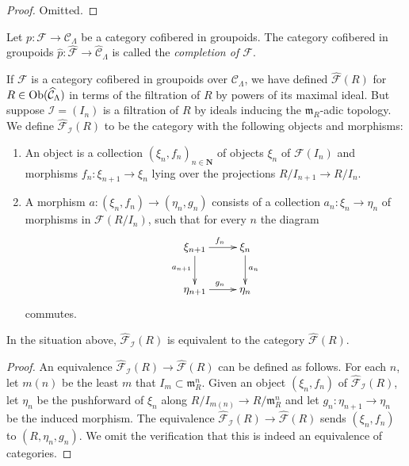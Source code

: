 \begin{proof}
Omitted.
\end{proof}

\begin{definition}
\label{definition-completion}
Let $p: \mathcal F \rightarrow \mathcal C_{\Lambda}$ be a category cofibered in 
groupoids.  The category cofibered in groupoids $\widehat{p}: \widehat{\mathcal 
F} \rightarrow \widehat{\mathcal C}_{\Lambda}$ is called the
{\it completion of $\mathcal F$}.
\end{definition}

\noindent
If $\mathcal F$ is a category cofibered in groupoids over $\mathcal 
C_{\Lambda}$, we have defined $\widehat{\mathcal F}(R)$ for $R \in 
\textnormal{Ob}(\widehat{\mathcal C}_{\Lambda})$ in terms of the filtration of 
$R$ by powers of its maximal ideal.  But suppose $\mathcal I = (I_{n})$ is a 
filtration of $R$ by ideals inducing the $\mathfrak{m}_{R}$-adic topology.  We 
define $\widehat{\mathcal{F}}_{\mathcal I}(R)$ to be the category with the 
following objects and morphisms:
\begin{enumerate}
\item An object is a collection $(\xi_{n}, f_{n})_{n \in \mathbf{N}}$ of 
objects $\xi_{n}$ of $\mathcal F(I_{n})$ and morphisms $f_{n}: \xi_{n+1} 
\rightarrow \xi_{n}$ lying over the projections $R/I_{n+1} \rightarrow R/I_{n}$.
\item A morphism $a: (\xi_n,f_n) \rightarrow (\eta_n, g_n)$ consists of a 
collection $a_n: \xi_n \rightarrow \eta_n$ of morphisms in $\mathcal 
F(R/I_{n})$, such that for every $n$ the diagram
\[
\xymatrix{
\xi_{n+1} \ar[r]^{f_{n}} \ar[d]_{a_{n+1}} & \xi_{n} \ar[d]^{a_{n}} \\
\eta_{n+1} \ar[r]^{g_{n}} & \eta_{n} 
}
\]
commutes.
\end{enumerate}

\begin{lemma}
\label{lemma-formal-objects-different-filtration}
In the situation above, $\widehat{\mathcal{F}}_{\mathcal I}(R)$ is equivalent 
to the category $\widehat{\mathcal F}(R)$.
\end{lemma}

\begin{proof}
An equivalence $\widehat{\mathcal{F}}_{\mathcal I}(R) \rightarrow 
\widehat{\mathcal F}(R)$ can be defined as follows.  For each $n$, let $m(n)$ 
be the least $m$ that $I_{m} \subset \mathfrak{m}_{R}^{n}$.  Given an object 
$(\xi_n,f_n)$ of $\widehat{\mathcal{F}}_{\mathcal I}(R)$, let $\eta_{n}$ be the 
pushforward of $\xi_{n}$ along $R/I_{m(n)} \rightarrow R/\mathfrak{m}_{R}^{n}$ 
and let $g_{n}: \eta_{n+1} \rightarrow \eta_{n}$ be the induced morphism.  The 
equivalence $\widehat{\mathcal{F}}_{\mathcal I}(R) \rightarrow 
\widehat{\mathcal F}(R)$ sends $(\xi_n,f_n)$ to $(R,\eta_n,g_n)$.  We omit the 
verification that this is indeed an equivalence of categories.
\end{proof}

